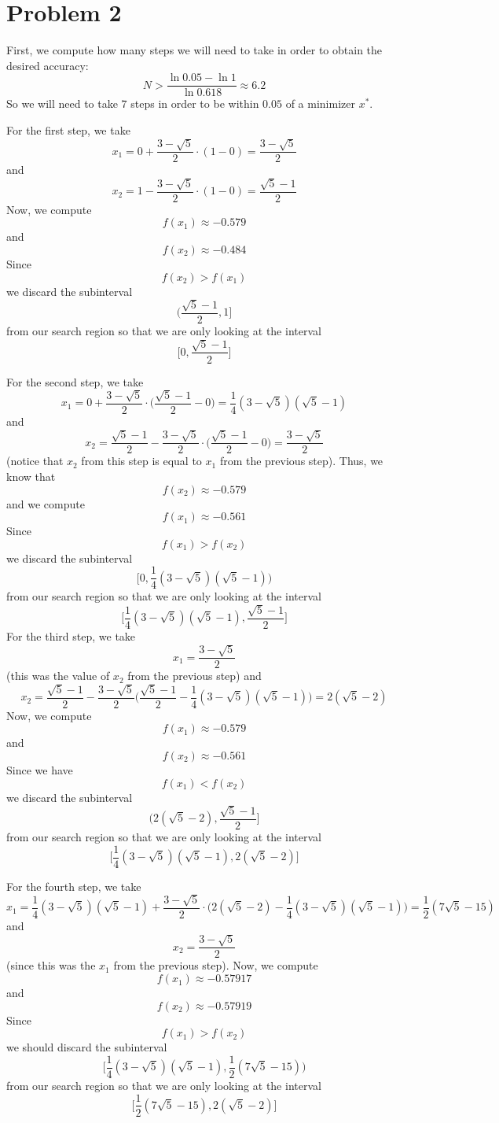 \documentclass[12pt]{article}
\begin{document}
\section*{Problem 2}
First, we compute how many steps we will need to take in order to obtain the desired accuracy:
\[
N > \frac{\ln 0.05 - \ln 1}{\ln 0.618} \approx 6.2
\] So we will need to take $7$ steps in order to be within $0.05$ of a minimizer $x^*$.

For the first step, we take 
\[
x_1 = 0 + \frac{3 - \sqrt{5}}{2} \cdot (1-0) = \frac{3 - \sqrt{5}}{2}
\] and
\[
x_2 = 1 - \frac{3 - \sqrt{5}}{2} \cdot (1-0) = \frac{\sqrt{5} - 1}{2}
\] Now, we compute
\[
f(x_1) \approx -0.579
\] and
\[
f(x_2) \approx -0.484
\] Since 
\[
f(x_2) > f(x_1)
\] we discard the subinterval
\[
\bigg(\frac{\sqrt{5} - 1}{2}, 1\bigg]
\] from our search region so that we are only looking at the interval
\[
\bigg[0, \frac{\sqrt{5} - 1}{2}\bigg]
\]

For the second step, we take
\[
x_1 = 0 + \frac{3 - \sqrt{5}}{2} \cdot \bigg(\frac{\sqrt{5} - 1}{2} - 0\bigg) = \frac{1}{4} (3 - \sqrt{5})(\sqrt{5} - 1)
\] and 
\[
x_2 = \frac{\sqrt{5} - 1}{2} - \frac{3 - \sqrt{5}}{2}  \cdot  \bigg(\frac{\sqrt{5} - 1}{2} - 0\bigg) = \frac{3 - \sqrt{5}}{2}
\] (notice that $x_2$ from this step is equal to $x_1$ from the previous step). Thus, we know that
\[
f(x_2) \approx -0.579
\] and we compute
\[
f(x_1) \approx -0.561
\] Since
\[
f(x_1) > f(x_2)
\] we discard the subinterval
\[
\bigg[0, \frac{1}{4} (3 - \sqrt{5})(\sqrt{5} - 1)\bigg)
\] from our search region so that we are only looking at the interval
\[
\bigg[\frac{1}{4} (3 - \sqrt{5})(\sqrt{5} - 1), \frac{\sqrt{5} - 1}{2} \bigg]
\] For the third step, we take
\[
x_1 =  \frac{3 - \sqrt{5}}{2}
\] (this was the value of $x_2$ from the previous step)
and 
\[
x_2 =  \frac{\sqrt{5}-1}{2} - \frac{3-\sqrt{5}}{2}\bigg(\frac{\sqrt{5}-1}{2} - \frac{1}{4} (3 - \sqrt{5})(\sqrt{5} - 1)\bigg) = 2(\sqrt{5} - 2)
\] Now, we compute
\[
f(x_1) \approx -0.579
\] and
\[
f(x_2) \approx -0.561
\] Since we have
\[
f(x_1) < f(x_2)
\] we discard the subinterval
\[
\bigg( 2(\sqrt{5} - 2), \frac{\sqrt{5} - 1}{2}\bigg]
\] from our search region so that we are only looking at the interval
\[
\bigg[\frac{1}{4} (3 - \sqrt{5})(\sqrt{5} - 1), 2(\sqrt{5} - 2)\bigg]
\]

For the fourth step, we take 
\[
x_1 = \frac{1}{4} (3 - \sqrt{5})(\sqrt{5} - 1) +  \frac{3 - \sqrt{5}}{2} \cdot \bigg(2(\sqrt{5} - 2) - \frac{1}{4} (3 - \sqrt{5})(\sqrt{5} - 1) \bigg) = \frac{1}{2}(7\sqrt{5} - 15)
\] and
\[
x_2 = \frac{3 - \sqrt{5}}{2}
\] (since this was the $x_1$ from the previous step). Now, we compute
\[
f(x_1) \approx -0.57917
\] and
\[
f(x_2) \approx -0.57919
\] Since
\[
f(x_1) > f(x_2)
\] we should discard the subinterval
\[
\bigg[ \frac{1}{4} (3 - \sqrt{5})(\sqrt{5} - 1), \frac{1}{2}(7\sqrt{5} - 15)\bigg)
\] from our search region so that we are only looking at the interval
\[
\bigg[\frac{1}{2}(7\sqrt{5} - 15), 2(\sqrt{5} - 2) \bigg]
\]
\end{document}
